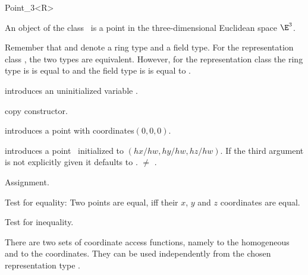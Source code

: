 \begin{ccRefClass} {Point_3<R>}

\ccDefinition
An object of the class \ccRefName\ is a point in the three-dimensional
Euclidean space $\E^3$. 

Remember that  and  denote a ring type 
and a field type.
For the representation class , the two types are 
equivalent.
However, for the representation class  the ring 
type is  is equal to  and the field type is 
 is equal to .


\ccCreation
{}


\ccHidden {}
             {introduces an uninitialized variable \ccVar.}

\ccHidden {}
 	    {copy constructor.}

 	    {introduces a point with  coordinates$(0,0,0)$.}

            {introduces a point \ccVar\ initialized to $(hx/hw,hy/hw, hz/hw)$.
             If the third argument is not explicitly given it defaults
             to .
	     \ccPrecond {} $\neq$ .}


\ccOperations

\ccHidden {}
        {Assignment.}

       {Test for equality: Two points are equal, iff their $x$, $y$ and $z$
        coordinates are equal.}

       {Test for inequality.}



There are two sets of coordinate access functions, namely to the
homogeneous and to the  coordinates. They can be used
independently from the chosen representation type .


\end{ccRefClass}
